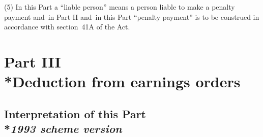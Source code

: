 \documentclass[12pt,a4paper]{article}
\begin{document}
(5) In this Part a “liable person” means a person liable to make a penalty payment and~in Part II and~in this Part “penalty payment” is to be construed in accordance with section~41A of the Act.


\section[Part III --- Deduction from earnings orders]{Part III\\*Deduction from earnings orders}

\renewcommand\parthead{--- Part III}

\subsection[8. Interpretation of this Part --- \emph{1993 scheme version}]{Interpretation of this Part\\*\emph{1993 scheme version}}
\end{document}
